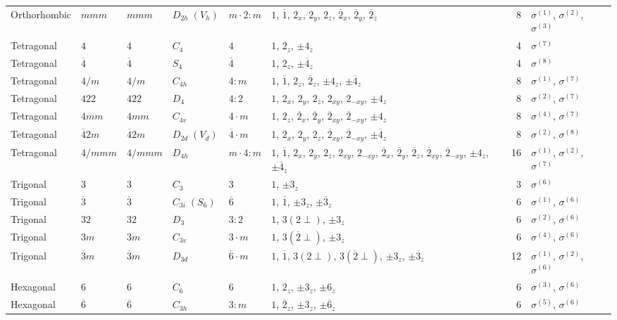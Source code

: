 \documentclass[a4paper,11pt]{article}
\newcommand{\ob}[1]{\overline{#1}}
\newcommand{\sg}[1]{\sigma^{(#1)}}
\begin{document}
\begin{landscape}
\begin{longtable}{l l l l l p{9.5cm} r l}
Orthorhombic & $mmm$ & $mmm$ & $D_{2h}\;(V_h)$ & $m{\cdot}2{:}m$ & $1$, $\ob{1}$, $2_x$, $2_y$, $2_z$, $\ob{2}_x$, $\ob{2}_y$, $\ob{2}_z$ & 8 & $\sg{1}$, $\sg{2}$, $\sg{3}$ \\
\addlinespace
Tetragonal & $4$ & $4$ & $C_4$ & $4$ & $1$, $2_z$, $\pm 4_z$ & 4 & $\sg{7}$ \\
Tetragonal & $\ob{4}$ & $\ob{4}$ & $S_4$ & $\ob{4}$ & $1$, $2_z$, $\pm\ob{4}_z$ & 4 & $\sg{8}$ \\
Tetragonal & $4/m$ & $4/m$ & $C_{4h}$ & $4{:}m$ & $1$, $\ob{1}$, $2_z$, $\ob{2}_z$, $\pm 4_z$, $\pm\ob{4}_z$ & 8 & $\sg{1}$, $\sg{7}$ \\
Tetragonal & $422$ & $422$ & $D_4$ & $4{:}2$ & $1$, $2_x$, $2_y$, $2_z$, $2_{xy}$, $2_{-xy}$, $\pm 4_z$ & 8 & $\sg{2}$, $\sg{7}$ \\
Tetragonal & $4mm$ & $4mm$ & $C_{4v}$ & $4{\cdot}m$ & $1$, $2_z$, $\ob{2}_x$, $\ob{2}_y$, $\ob{2}_{xy}$, $\ob{2}_{-xy}$, $\pm 4_z$ & 8 & $\sg{4}$, $\sg{7}$ \\
Tetragonal & $\ob{4}2m$ & $\ob{4}2m$ & $D_{2d}\;(V_d)$ & $\ob{4}{\cdot}m$ & $1$, $2_x$, $2_y$, $2_z$, $\ob{2}_{xy}$, $\ob{2}_{-xy}$, $\pm\ob{4}_z$ & 8 & $\sg{2}$, $\sg{8}$ \\
Tetragonal & $4/mmm$ & $4/mmm$ & $D_{4h}$ & $m{\cdot}4{:}m$ & $1$, $\ob{1}$, $2_x$, $2_y$, $2_z$, $2_{xy}$, $2_{-xy}$, $\ob{2}_x$, $\ob{2}_y$, $\ob{2}_z$, $\ob{2}_{xy}$, $\ob{2}_{-xy}$, $\pm 4_z$, $\pm\ob{4}_z$ & 16 & $\sg{1}$, $\sg{2}$, $\sg{7}$ \\
\addlinespace
Trigonal & $3$ & $3$ & $C_3$ & $3$ & $1$, $\pm 3_z$ & 3 & $\sg{6}$ \\
Trigonal & $\ob{3}$ & $\ob{3}$ & $C_{3i}\;(S_6)$ & $\ob{6}$ & $1$, $\ob{1}$, $\pm 3_z$, $\pm\ob{3}_z$ & 6 & $\sg{1}$, $\sg{6}$ \\
Trigonal & $32$ & $32$ & $D_3$ & $3{:}2$ & $1$, $3(2{\perp})$, $\pm 3_z$ & 6 & $\sg{2}$, $\sg{6}$ \\
Trigonal & $3m$ & $3m$ & $C_{3v}$ & $3{\cdot}m$ & $1$, $3(\ob{2}{\perp})$, $\pm 3_z$ & 6 & $\sg{4}$, $\sg{6}$ \\
Trigonal & $\ob{3}m$ & $\ob{3}m$ & $D_{3d}$ & $\ob{6}{\cdot}m$ & $1$, $\ob{1}$, $3(2{\perp})$, $3(\ob{2}{\perp})$, $\pm 3_z$, $\pm\ob{3}_z$ & 12 & $\sg{1}$, $\sg{2}$, $\sg{6}$ \\
\addlinespace
Hexagonal & $6$ & $6$ & $C_6$ & $6$ & $1$, $2_z$, $\pm 3_z$, $\pm 6_z$ & 6 & $\sg{3}$, $\sg{6}$ \\
Hexagonal & $\ob{6}$ & $\ob{6}$ & $C_{3h}$ & $3{:}m$ & $1$, $\ob{2}_z$, $\pm 3_z$, $\pm\ob{6}_z$ & 6 & $\sg{5}$, $\sg{6}$ \\

\end{longtable}
\end{landscape}
\end{document}

